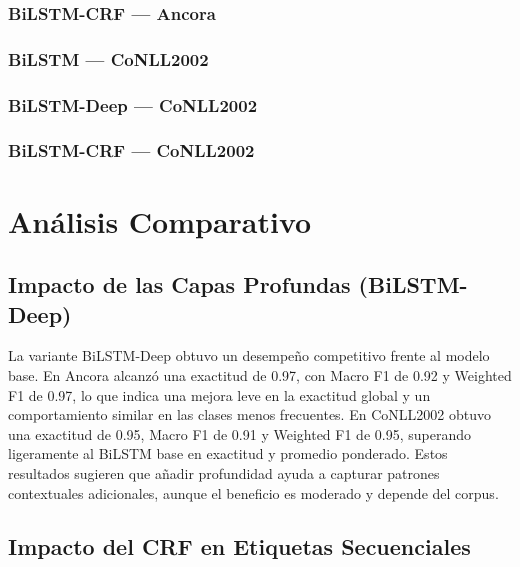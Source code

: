 \documentclass[12pt, a4paper]{article}
\begin{document}
\subsubsection{BiLSTM-CRF — Ancora}


\subsubsection{BiLSTM — CoNLL2002}


\subsubsection{BiLSTM-Deep — CoNLL2002}


\subsubsection{BiLSTM-CRF — CoNLL2002}




\section{Análisis Comparativo}

\subsection{Impacto de las Capas Profundas (BiLSTM-Deep)}

La variante BiLSTM-Deep obtuvo un desempeño competitivo frente al modelo base. En Ancora alcanzó una exactitud de 0.97, con Macro F1 de 0.92 y Weighted F1 de 0.97, lo que indica una mejora leve en la exactitud global y un comportamiento similar en las clases menos frecuentes. En CoNLL2002 obtuvo una exactitud de 0.95, Macro F1 de 0.91 y Weighted F1 de 0.95, superando ligeramente al BiLSTM base en exactitud y promedio ponderado. Estos resultados sugieren que añadir profundidad ayuda a capturar patrones contextuales adicionales, aunque el beneficio es moderado y depende del corpus.

\subsection{Impacto del CRF en Etiquetas Secuenciales}
\end{document}
